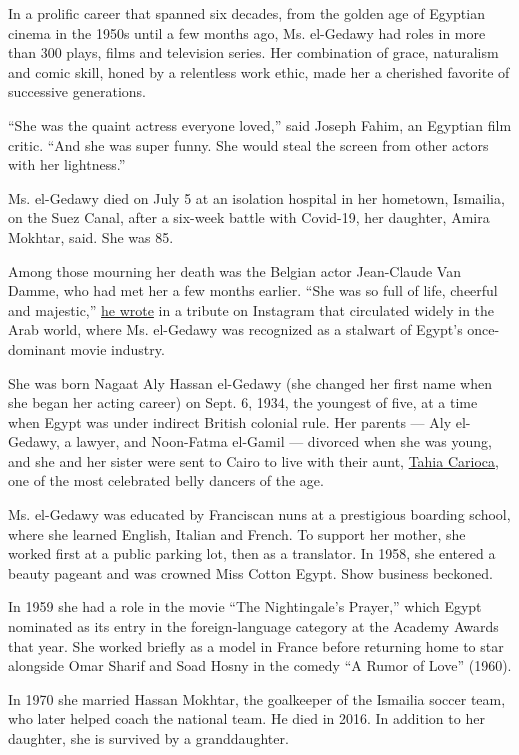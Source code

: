 In a prolific career that spanned six decades, from the golden age of
Egyptian cinema in the 1950s until a few months ago, Ms. el-Gedawy had
roles in more than 300 plays, films and television series. Her
combination of grace, naturalism and comic skill, honed by a relentless
work ethic, made her a cherished favorite of successive generations.

``She was the quaint actress everyone loved,'' said Joseph Fahim, an
Egyptian film critic. ``And she was super funny. She would steal the
screen from other actors with her lightness.''

Ms. el-Gedawy died on July 5 at an isolation hospital in her hometown,
Ismailia, on the Suez Canal, after a six-week battle with Covid-19, her
daughter, Amira Mokhtar, said. She was 85.

Among those mourning her death was the Belgian actor Jean-Claude Van
Damme, who had met her a few months earlier. ``She was so full of life,
cheerful and majestic,''
\href{https://www.instagram.com/p/CCSrVanFNwJ/?utm_source=ig_embed}{he
wrote} in a tribute on Instagram that circulated widely in the Arab
world, where Ms. el-Gedawy was recognized as a stalwart of Egypt's
once-dominant movie industry.

She was born Nagaat Aly Hassan el-Gedawy (she changed her first name
when she began her acting career) on Sept. 6, 1934, the youngest of
five, at a time when Egypt was under indirect British colonial rule. Her
parents --- Aly el-Gedawy, a lawyer, and Noon-Fatma el-Gamil ---
divorced when she was young, and she and her sister were sent to Cairo
to live with their aunt,
\href{https://www.nytimes.com/1999/09/22/arts/tahia-carioca-79-dies-a-renowned-belly-dancer.html}{Tahia
Carioca}, one of the most celebrated belly dancers of the age.

Ms. el-Gedawy was educated by Franciscan nuns at a prestigious boarding
school, where she learned English, Italian and French. To support her
mother, she worked first at a public parking lot, then as a translator.
In 1958, she entered a beauty pageant and was crowned Miss Cotton Egypt.
Show business beckoned.

In 1959 she had a role in the movie ``The Nightingale's Prayer,'' which
Egypt nominated as its entry in the foreign-language category at the
Academy Awards that year. She worked briefly as a model in France before
returning home to star alongside Omar Sharif and Soad Hosny in the
comedy ``A Rumor of Love'' (1960).

In 1970 she married Hassan Mokhtar, the goalkeeper of the Ismailia
soccer team, who later helped coach the national team. He died in 2016.
In addition to her daughter, she is survived by a granddaughter.

